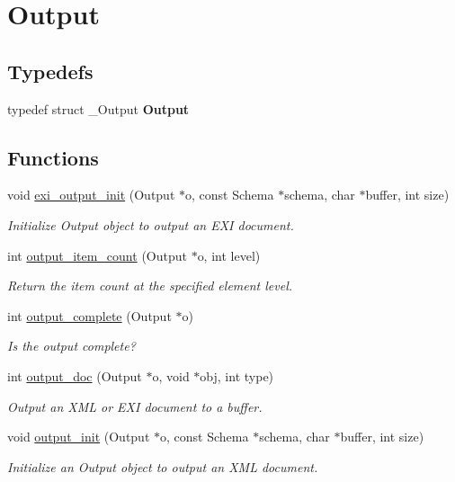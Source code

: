 \hypertarget{group__output}{}\section{Output}
\label{group__output}
\subsection*{Typedefs}
\begin{DoxyCompactItemize}
\item 
\mbox{\label{group__output_gad9787f49c9332986ed28632e7a39b51c}} 
typedef struct \+\_\+\+Output {\bfseries Output}
\end{DoxyCompactItemize}
\subsection*{Functions}
\begin{DoxyCompactItemize}
\item 
void \hyperlink{group__output_ga6a3d8746b3070887a072f85dccf9d1c4}{exi\+\_\+output\+\_\+init} (Output $\ast$o, const Schema $\ast$schema, char $\ast$buffer, int size)
\begin{DoxyCompactList}\small\item\em Initialize Output object to output an E\+XI document. \end{DoxyCompactList}\item 
int \hyperlink{group__output_ga3d946f83e9903a8f747658e0661a5e45}{output\+\_\+item\+\_\+count} (Output $\ast$o, int level)
\begin{DoxyCompactList}\small\item\em Return the item count at the specified element level. \end{DoxyCompactList}\item 
int \hyperlink{group__output_ga01c802e726b86aedea1ab32b6367c93a}{output\+\_\+complete} (Output $\ast$o)
\begin{DoxyCompactList}\small\item\em Is the output complete? \end{DoxyCompactList}\item 
int \hyperlink{group__output_ga4061286ee8f7db4179a5c05cd0c53ab1}{output\+\_\+doc} (Output $\ast$o, void $\ast$obj, int type)
\begin{DoxyCompactList}\small\item\em Output an X\+ML or E\+XI document to a buffer. \end{DoxyCompactList}\item 
void \hyperlink{group__output_ga713d5923db024e1e4ef5d65fa372c133}{output\+\_\+init} (Output $\ast$o, const Schema $\ast$schema, char $\ast$buffer, int size)
\begin{DoxyCompactList}\small\item\em Initialize an Output object to output an X\+ML document. \end{DoxyCompactList}\end{DoxyCompactItemize}


